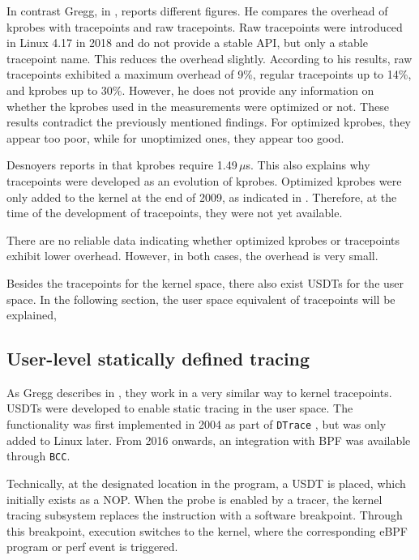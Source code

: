 In contrast Gregg, in \cite[Chap.~2.9.5]{Gregg_2020}, reports different figures.  
He compares the overhead of \acp{kprobe} with tracepoints and raw tracepoints.  
Raw tracepoints were introduced in Linux 4.17 in 2018 and do not provide a stable API, but only a stable tracepoint name.  
This reduces the overhead slightly.  
According to his results, raw tracepoints exhibited a maximum overhead of 9\%, regular tracepoints up to 14\%, and \acp{kprobe} up to 30\%.  
However, he does not provide any information on whether the \acp{kprobe} used in the measurements were optimized or not.  
These results contradict the previously mentioned findings.
For optimized \acp{kprobe}, they appear too poor, while for unoptimized ones, they appear too good.  

Desnoyers reports in \cite[p.~94]{Desnoyers2009} that \acp{kprobe} require 1.49\,$\mu$s.  
This also explains why tracepoints were developed as an evolution of \acp{kprobe}.  
Optimized \acp{kprobe} were only added to the kernel at the end of 2009, as indicated in \cite{kprobe_opt}.  
Therefore, at the time of the development of tracepoints, they were not yet available.  

There are no reliable data indicating whether optimized \acp{kprobe} or tracepoints exhibit lower overhead.  
However, in both cases, the overhead is very small.  

Besides the tracepoints for the kernel space, there also exist \acp{USDT} for the user space.  
In the following section, the user space equivalent of tracepoints will be explained,

\subsection{User-level statically defined tracing}
As Gregg describes in \cite[Chap.~2.10]{Gregg_2020}, they work in a very similar way to kernel tracepoints.  
\acp{USDT} were developed to enable static tracing in the user space.  
The functionality was first implemented in 2004 as part of \texttt{DTrace} \cite{USDT,269899}, but was only added to Linux later.  
From 2016 onwards, an integration with \ac{BPF} was available through \texttt{BCC}.  

Technically, at the designated location in the program, a \ac{USDT} is placed, which initially exists as a NOP.  
When the probe is enabled by a tracer, the kernel tracing subsystem replaces the instruction with a software breakpoint.  
Through this breakpoint, execution switches to the kernel, where the corresponding eBPF program or perf event is triggered.  

